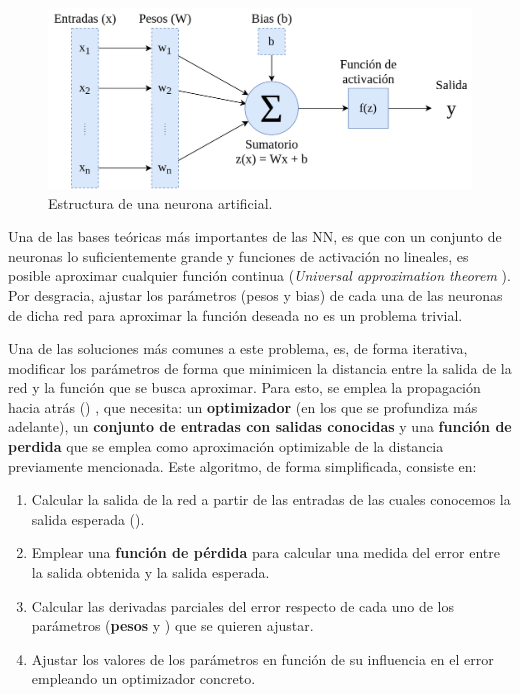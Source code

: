 \begin{figure}[H]
\centering
\includegraphics[width=.75\linewidth]{imagenes/neurona.png} 
\captionsetup{width=.5\linewidth}
\caption{Estructura de una neurona artificial.}
\label{fig:neurona}
\end{figure}

Una de las bases teóricas más importantes de las NN, es que con un conjunto de neuronas lo suficientemente grande y funciones de activación no lineales, es posible aproximar cualquier función continua (\textit{Universal approximation theorem} \cite{universal-approximators}). Por desgracia, ajustar los parámetros (pesos y bias) de cada una de las neuronas de dicha red para aproximar la función deseada no es un problema trivial. 

Una de las soluciones más comunes a este problema, es, de forma iterativa, modificar los parámetros de forma que minimicen la distancia entre la salida de la red y la función que se busca aproximar. Para esto, se emplea la propagación hacia atrás () \cite{backprop}, que necesita: un \textbf{optimizador} (en los que se profundiza más adelante), un \textbf{conjunto de entradas con salidas conocidas} y una \textbf{función de perdida} que se emplea como aproximación optimizable de la distancia previamente mencionada. Este algoritmo, de forma simplificada, consiste en:

\begin{enumerate}
\item Calcular la salida de la red a partir de las entradas de las cuales conocemos la salida esperada ().
\item Emplear una \textbf{función de pérdida} para calcular una medida del error entre la salida obtenida y la salida esperada.
\item Calcular las derivadas parciales del error respecto de cada uno de los parámetros (\textbf{pesos} y ) que se quieren ajustar.
\item Ajustar los valores de los parámetros en función de su influencia en el error empleando un optimizador concreto.
\end{enumerate}

